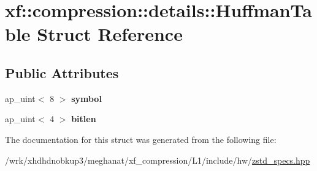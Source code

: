 \hypertarget{structxf_1_1compression_1_1details_1_1HuffmanTable}{\section{xf\-:\-:compression\-:\-:details\-:\-:Huffman\-Table Struct Reference}
\label{structxf_1_1compression_1_1details_1_1HuffmanTable}
}
\subsection*{Public Attributes}
\begin{DoxyCompactItemize}
\item 
\hypertarget{structxf_1_1compression_1_1details_1_1HuffmanTable_adac0932855f14f60ce604f2066670fea}{ap\-\_\-uint$<$ 8 $>$ {\bfseries symbol}}\label{structxf_1_1compression_1_1details_1_1HuffmanTable_adac0932855f14f60ce604f2066670fea}

\item 
\hypertarget{structxf_1_1compression_1_1details_1_1HuffmanTable_aacb5ca2feeb278e5ea4e143d63612beb}{ap\-\_\-uint$<$ 4 $>$ {\bfseries bitlen}}\label{structxf_1_1compression_1_1details_1_1HuffmanTable_aacb5ca2feeb278e5ea4e143d63612beb}

\end{DoxyCompactItemize}


The documentation for this struct was generated from the following file\-:\begin{DoxyCompactItemize}
\item 
/wrk/xhdhdnobkup3/meghanat/xf\-\_\-compression/\-L1/include/hw/\hyperlink{zstd__specs_8hpp}{zstd\-\_\-specs.\-hpp}\end{DoxyCompactItemize}
